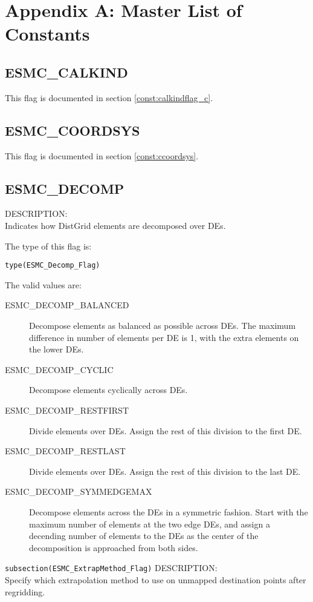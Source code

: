 
\section{Appendix A: Master List of Constants}
\label{const:cmaster}

\subsection{ESMC\_CALKIND}
This flag is documented in section \ref{const:calkindflag_c}.

\subsection{ESMC\_COORDSYS}
This flag is documented in section \ref{const:ccoordsys}.

\subsection{ESMC\_DECOMP}
\label{const:cdecompflag}
{\sf DESCRIPTION:\\}
Indicates how DistGrid elements are decomposed over DEs.

The type of this flag is:

{\tt type(ESMC\_Decomp\_Flag)}

The valid values are:
\begin{description}
\item [ESMC\_DECOMP\_BALANCED]
      Decompose elements as balanced as possible across DEs. The maximum 
      difference in number of elements per DE is 1, with the extra elements on
      the lower DEs.
\item [ESMC\_DECOMP\_CYCLIC]
      Decompose elements cyclically across DEs.
\item [ESMC\_DECOMP\_RESTFIRST]
      Divide elements over DEs. Assign the rest of this division to the first
      DE.
\item [ESMC\_DECOMP\_RESTLAST]
      Divide elements over DEs. Assign the rest of this division to the last DE.
\item [ESMC\_DECOMP\_SYMMEDGEMAX]
      Decompose elements across the DEs in a symmetric fashion. Start with the
      maximum number of elements at the two edge DEs, and assign a decending
      number of elements to the DEs as the center of the decomposition is 
      approached from both sides.
\end{description}

{\tt subsection(ESMC\_ExtrapMethod\_Flag)}
\label{opt:cextrapmethod}
{\sf DESCRIPTION:\\}
Specify which extrapolation method to use on unmapped destination points after 
regridding.

